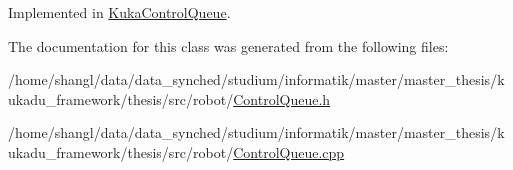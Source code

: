 \-Implemented in \hyperlink{classKukaControlQueue_a3e59c3d253d2306b5fdde56da529c9cd}{\-Kuka\-Control\-Queue}.



\-The documentation for this class was generated from the following files\-:\begin{DoxyCompactItemize}
\item 
/home/shangl/data/data\-\_\-synched/studium/informatik/master/master\-\_\-thesis/kukadu\-\_\-framework/thesis/src/robot/\hyperlink{ControlQueue_8h}{\-Control\-Queue.\-h}\item 
/home/shangl/data/data\-\_\-synched/studium/informatik/master/master\-\_\-thesis/kukadu\-\_\-framework/thesis/src/robot/\hyperlink{ControlQueue_8cpp}{\-Control\-Queue.\-cpp}\end{DoxyCompactItemize}
